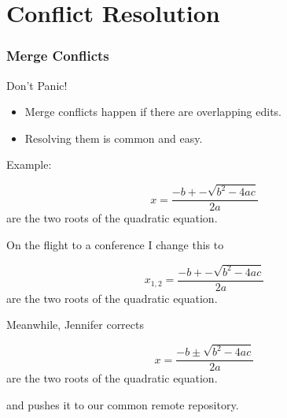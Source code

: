 \section{Conflict Resolution}


\begin{frame}[fragile]
  \frametitle{Merge Conflicts}
  
  \begin{center}
    \Large Don't Panic!
  \end{center}

  \begin{itemize}
  \item 
    Merge conflicts happen if there are overlapping edits.
  \item 
    Resolving them is common and easy.
  \end{itemize}
  
  Example:
  \begin{latexCode}
    \begin{equation}
      \label{eq:quad}
      x = \frac{-b+-\sqrt{b^2-4ac}}{2a}
    \end{equation}
    are the two roots of the quadratic equation.
  \end{latexCode}
  
\end{frame}



\begin{frame}[fragile]
  
  On the flight to a conference I change this to
  \begin{latexCode}
    \begin{equation}
      \label{eq:quad}
      x_{1,2} = \frac{-b+-\sqrt{b^2-4ac}}{2a}
    \end{equation}
    are the two roots of the quadratic equation.
  \end{latexCode}
  \medskip
  \pause
  
  Meanwhile, Jennifer corrects
  \begin{latexCode}
    \begin{equation}
      \label{eq:quad}
      x = \frac{-b\pm\sqrt{b^2-4ac}}{2a}
    \end{equation}
    are the two roots of the quadratic equation.
  \end{latexCode}
  and pushes it to our common remote repository.
  
\end{frame}




